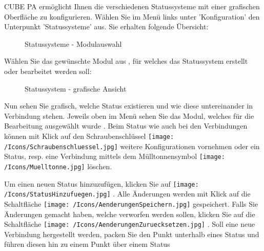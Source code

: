 CUBE PA ermöglicht Ihnen die verschiedenen Statussysteme mit einer grafischen Oberfläche zu konfigurieren. Wählen Sie im Menü links unter 'Konfiguration' den Unterpunkt 'Statussysteme' aus. Sie erhalten folgende Übersicht:

\begin{figure}[H]
\caption{Statussysteme - Modulauswahl}
\end{figure}

Wählen Sie das gewünschte Modul aus , für welches das Statussystem erstellt oder bearbeitet werden soll:

\begin{figure}[H]
\caption{Statussystem - grafische Ansicht}
\end{figure}

Nun sehen Sie grafisch, welche Status existieren und wie diese untereinander in Verbindung stehen. Jeweils oben im Menü sehen Sie das Modul, welches für die Bearbeitung ausgewählt wurde .
Beim Status wie auch bei den Verbindungen können mit Klick auf den Schraubenschlüssel \texttt{[image: /Icons/Schraubenschluessel.jpg]}  weitere Konfigurationen vornehmen oder ein Status, resp. eine Verbindung mittels dem Mülltonnensymbol \texttt{[image: /Icons/Muelltonne.jpg]}  löschen.

\vspace{\baselineskip}

Um einen neuen Status hinzuzufügen, klicken Sie auf \texttt{[image: /Icons/StatusHinzufuegen.jpg]} . Alle Änderungen werden mit Klick auf die Schaltfläche \texttt{[image: /Icons/AenderungenSpeichern.jpg]}  gespeichert. Falls Sie Änderungen gemacht haben, welche verworfen werden sollen, klicken Sie auf die Schaltfläche \texttt{[image: /Icons/AenderungenZuruecksetzen.jpg]} . Soll eine neue Verbindung hergestellt werden, packen Sie den Punkt unterhalb eines Status  und führen diesen hin zu einem Punkt über einem Status 


